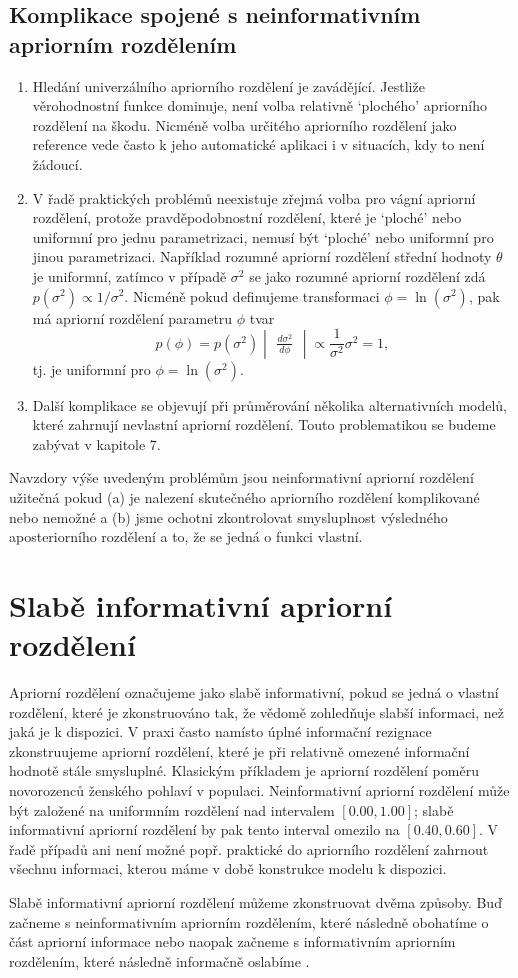 \subsection{Komplikace spojené s neinformativním apriorním rozdělením}

\begin{enumerate}
\item Hledání univerzálního apriorního rozdělení je zavádějící. Jestliže věrohodnostní funkce dominuje, není volba relativně `plochého' apriorního rozdělení na škodu. Nicméně volba určitého apriorního rozdělení jako reference vede často k jeho automatické aplikaci i v situacích, kdy to není žádoucí.
\item V řadě praktických problémů neexistuje zřejmá volba pro vágní apriorní rozdělení, protože pravděpodobnostní rozdělení, které je `ploché' nebo uniformní pro jednu parametrizaci, nemusí být `ploché' nebo uniformní pro jinou parametrizaci. Například rozumné apriorní rozdělení střední hodnoty $\theta$ je uniformní, zatímco v případě $\sigma^2$ se jako rozumné apriorní rozdělení zdá $p(\sigma^2) \varpropto 1 / \sigma^2$. Nicméně pokud definujeme transformaci $\phi = \ln(\sigma^2)$, pak má apriorní rozdělení parametru $\phi$ tvar
\begin{equation}
p(\phi) = p(\sigma^2) \begin{vmatrix}\frac{d \sigma^2}{d \phi}\end{vmatrix} \varpropto \frac{1}{\sigma^2} \sigma^2 = 1,
\end{equation}
tj. je uniformní pro $\phi = \ln(\sigma^2)$.
\item Další komplikace se objevují při průměrování několika alternativních modelů, které zahrnují nevlastní apriorní rozdělení. Touto problematikou se budeme zabývat v kapitole 7.
\end{enumerate}

Navzdory výše uvedeným problémům jsou neinformativní apriorní rozdělení užitečná pokud (a) je nalezení skutečného apriorního rozdělení komplikované nebo nemožné a (b) jsme ochotni zkontrolovat smysluplnost výsledného aposteriorního rozdělení a to, že se jedná o funkci vlastní.

\section{Slabě informativní apriorní rozdělení}

Apriorní rozdělení označujeme jako slabě informativní, pokud se jedná o vlastní rozdělení, které je zkonstruováno tak, že vědomě zohledňuje slabší informaci, než jaká je k dispozici. V praxi často namísto úplné informační rezignace zkonstruujeme apriorní rozdělení, které je při relativně omezené informační hodnotě stále smysluplné. Klasickým příkladem je apriorní rozdělení poměru novorozenců ženského pohlaví v populaci. Neinformativní apriorní rozdělení může být založené na uniformním rozdělení nad intervalem $[0.00, 1.00]$; slabě informativní apriorní rozdělení by pak tento interval omezilo na $[0.40, 0.60]$. V řadě případů ani není možné popř. praktické do apriorního rozdělení zahrnout všechnu informaci, kterou máme v době konstrukce modelu k dispozici.

Slabě informativní apriorní rozdělení můžeme zkonstruovat dvěma způsoby. Buď začneme s neinformativním apriorním rozdělením, které následně obohatíme o část apriorní informace nebo naopak začneme s informativním apriorním rozdělením, které následně informačně oslabíme
.
